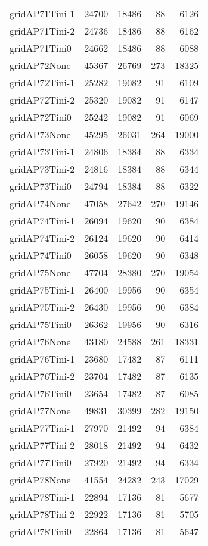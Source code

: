 \begin{longtable}{lrrrr}
gridAP71Tini-1 & 24700 & 18486 & 88 & 6126 \\
gridAP71Tini-2 & 24736 & 18486 & 88 & 6162 \\
gridAP71Tini0 & 24662 & 18486 & 88 & 6088 \\
gridAP72None & 45367 & 26769 & 273 & 18325 \\
gridAP72Tini-1 & 25282 & 19082 & 91 & 6109 \\
gridAP72Tini-2 & 25320 & 19082 & 91 & 6147 \\
gridAP72Tini0 & 25242 & 19082 & 91 & 6069 \\
gridAP73None & 45295 & 26031 & 264 & 19000 \\
gridAP73Tini-1 & 24806 & 18384 & 88 & 6334 \\
gridAP73Tini-2 & 24816 & 18384 & 88 & 6344 \\
gridAP73Tini0 & 24794 & 18384 & 88 & 6322 \\
gridAP74None & 47058 & 27642 & 270 & 19146 \\
gridAP74Tini-1 & 26094 & 19620 & 90 & 6384 \\
gridAP74Tini-2 & 26124 & 19620 & 90 & 6414 \\
gridAP74Tini0 & 26058 & 19620 & 90 & 6348 \\
gridAP75None & 47704 & 28380 & 270 & 19054 \\
gridAP75Tini-1 & 26400 & 19956 & 90 & 6354 \\
gridAP75Tini-2 & 26430 & 19956 & 90 & 6384 \\
gridAP75Tini0 & 26362 & 19956 & 90 & 6316 \\
gridAP76None & 43180 & 24588 & 261 & 18331 \\
gridAP76Tini-1 & 23680 & 17482 & 87 & 6111 \\
gridAP76Tini-2 & 23704 & 17482 & 87 & 6135 \\
gridAP76Tini0 & 23654 & 17482 & 87 & 6085 \\
gridAP77None & 49831 & 30399 & 282 & 19150 \\
gridAP77Tini-1 & 27970 & 21492 & 94 & 6384 \\
gridAP77Tini-2 & 28018 & 21492 & 94 & 6432 \\
gridAP77Tini0 & 27920 & 21492 & 94 & 6334 \\
gridAP78None & 41554 & 24282 & 243 & 17029 \\
gridAP78Tini-1 & 22894 & 17136 & 81 & 5677 \\
gridAP78Tini-2 & 22922 & 17136 & 81 & 5705 \\
gridAP78Tini0 & 22864 & 17136 & 81 & 5647 \\

\end{longtable}
